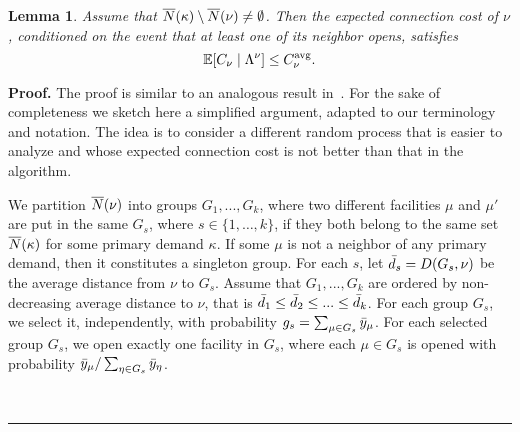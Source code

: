 \documentclass[oneside,final]{ucr}
\newtheorem{lemma}[theorem]{Lemma}
\newenvironment{proof}[1][Proof]{\textbf{#1.} }{\ \rule{0.5em}{0.5em}}
\begin{document}
\begin{lemma}\label{lem: echs expected C_nu}
Assume that ${\overline{N}}(\kappa) \setminus {\overline{N}}(\nu) \neq \emptyset$.
Then the expected connection cost of $\nu$, conditioned on the event that at least one of 
its neighbor opens, satisfies
%
\begin{equation*}
  \mathbb{E}[C_\nu \mid \Lambda^\nu] \leq C^{{\mbox{\scriptsize\rm avg}}}_{\nu}.
\end{equation*}
\end{lemma}
\begin{proof}
The proof is similar to an analogous result in~\cite{ChudakS04,ByrkaA10}. 
For the sake of completeness we sketch here a simplified argument, adapted to our
terminology and notation.
The idea is to consider a different random process that is
easier to analyze and whose expected connection cost is not better than that in
the algorithm.

We partition ${\overline{N}}(\nu)$ into groups $G_1,...,G_k$, where two
different facilities $\mu$ and $\mu'$ are put in the same $G_s$, where
$s\in \{1,\ldots,k\}$, if they both belong to the same set
${\overline{N}}(\kappa)$ for some primary demand $\kappa$. If some $\mu$ is
not a neighbor of any primary demand, then it constitutes a singleton
group.  For each $s$, let ${\bar d}_s = D(G_s,\nu)$ be the average
distance from $\nu$ to $G_s$.  Assume that $G_1,...,G_k$ are ordered
by non-decreasing average distance to $\nu$, that is ${\bar d}_1 \le
{\bar d}_2 \le ... \le {\bar d}_k$.  For each group $G_s$, we select it,
independently, with probability $g_s = \sum_{\mu\in G_s}{\bar y}_{\mu}$.
For each selected group $G_s$,  we
open exactly one facility in $G_s$, where each $\mu\in G_s$
is opened with probability ${\bar y}_{\mu}/\sum_{\eta\in G_s}
{\bar y}_{\eta}$.


\end{proof}
\end{document}
